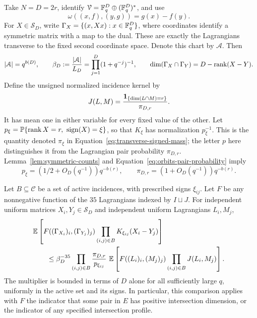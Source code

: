 Take $N=D=2r$, identify $\mathcal V=\mathbb F_q^D\oplus(\mathbb F_q^D)^*$, and use
\begin{equation}
 \omega((x,f),(y,g))=g(x)-f(y).
 \label{eq:orbits-coordinate-form}
\end{equation}
For $X\in\mathcal S_D$, write $\Gamma_X=\{(x,Xx):x\in\mathbb F_q^D\}$,
where coordinates identify a symmetric matrix with a map to the dual.
These are exactly the Lagrangians transverse to the fixed second
coordinate space.  Denote this chart by $\mathcal A$.  Then
\begin{equation}
 |\mathcal A|=q^{b(D)},\qquad
 \beta_D:=\frac{|\mathcal A|}{L_D}=\prod_{j=1}^D(1+q^{-j})^{-1},
 \qquad
 \dim(\Gamma_X\cap\Gamma_Y)=D-\operatorname{rank}(X-Y).
 \label{eq:orbits-chart}
\end{equation}
Define the unsigned normalized incidence kernel by
\begin{equation}
 J(L,M)=\frac{\mathbf 1_{\{\dim(L\cap M)=r\}}}{\pi_{D,r}}.
 \label{eq:orbits-unsigned-kernel}
\end{equation}
It has mean one in either variable for every fixed value of the other.
Let
$p_\xi=\P\{\rank X=r,\ \operatorname{sign}(X)=\xi\}$,
so that $K_\xi$ has normalization $p_\xi^{-1}$. This is the quantity
denoted \(\pi_\xi\) in Equation~\eqref{eq:transverse-signed-mass};
the letter \(p\) here distinguishes it from the Lagrangian pair
probability \(\pi_{D,r}\).
Lemma~\ref{lem:symmetric-counts} and
Equation~\eqref{eq:orbits-pair-probability} imply
\begin{equation}
 p_\xi=(1/2+O_D(q^{-1}))q^{-b(r)},\qquad
 \pi_{D,r}=(1+O_D(q^{-1}))q^{-b(r)}.
 \label{eq:orbits-normalizers}
\end{equation}

\begin{lemma}
\label{lem:chart-comparison}
Let $B\subseteq\mathscr C$ be a set of active incidences, with prescribed
signs $\xi_{ij}$.  Let $F$ be any nonnegative function of the $35$
Lagrangians indexed by $I\sqcup J$.  For independent uniform matrices
$X_i,Y_j\in\mathcal S_D$ and independent uniform Lagrangians $L_i,M_j$,
\begin{align}
 &\mathbb E\left[
 F((\Gamma_{X_i})_i,(\Gamma_{Y_j})_j)
 \prod_{(i,j)\in B}K_{\xi_{ij}}(X_i-Y_j)\right]\notag\\
 &\qquad\le
 \beta_D^{-35}\prod_{(i,j)\in B}\frac{\pi_{D,r}}{p_{\xi_{ij}}}
 \ \mathbb E\left[F((L_i)_i,(M_j)_j)
 \prod_{(i,j)\in B}J(L_i,M_j)\right].
 \label{eq:orbits-chart-comparison}
\end{align}
The multiplier is bounded in terms of $D$ alone for all sufficiently large
$q$, uniformly in the active set and its signs.  In particular, this
comparison applies with $F$ the indicator that some pair in $E$ has
positive intersection dimension, or the indicator of any specified
intersection profile.
\end{lemma}

